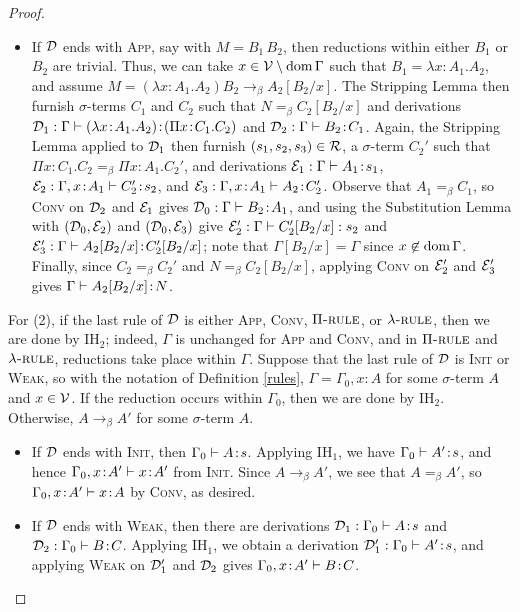 \documentclass[reqno, twoside]{article}
\begin{document}
\begin{proof}
\begin{itemize}
            \item If $\mathcal{D}$ ends with \textsc{App}, say with $M=B_1\,B_2$, then reductions within either $B_1$ or $B_2$ are trivial. Thus, we can take $x\in\mathcal{V}\setminus\operatorname{dom}\Gamma$ such that $B_1=\lambda x\!:\!A_1.A_2$, and assume $M=(\lambda x\!:\!A_1.A_2)B_2\rightarrow_\beta A_2[B_2/x]$. The Stripping Lemma then furnish $\sigma$-terms $C_1$ and $C_2$ such that $N=_\beta C_2[B_2/x]$ and derivations $\mathcal{D}_1:\Gamma\vdash(\lambda x\!:\!A_1.A_2)\!:\!(\Pi x\!:\!C_1.C_2)$ and $\mathcal{D}_2:\Gamma\vdash B_2\!:\!C_1$. Again, the Stripping Lemma applied to $\mathcal{D}_1$ then furnish $(s_1,s_2,s_3)\in\mathcal{R}$, a $\sigma$-term $C_2'$ such that $\Pi x\!:\!C_1.C_2=_\beta\Pi x\!:\!A_1.C_2'$, and derivations $\mathcal{E}_1:\Gamma\vdash A_1\!:\!s_1$, $\mathcal{E}_2:\Gamma,x\!:\!A_1\vdash C'_2\!:\!s_2$, and $\mathcal{E}_3:\Gamma,x\!:\!A_1\vdash A_2\!:\!C_2'$. Observe that $A_1=_\beta C_1$, so \textsc{Conv} on $\mathcal{D}_2$ and $\mathcal{E}_1$ gives $\mathcal{D}_0:\Gamma\vdash B_2\!:\!A_1$, and using the Substitution Lemma with $(\mathcal{D}_0,\mathcal{E}_2)$ and $(\mathcal{D}_0,\mathcal{E}_3)$ give $\mathcal{E}_2':\Gamma\vdash C_2'[B_2/x]:s_2$ and $\mathcal{E}_3':\Gamma\vdash A_2[B_2/x]\!:\!C_2'[B_2/x]$; note that $\Gamma[B_2/x]=\Gamma$ since $x\not\in\operatorname{dom}\Gamma$. Finally, since $C_2=_\beta C_2'$ and $N=_\beta C_2[B_2/x]$, applying \textsc{Conv} on $\mathcal{E}_2'$ and $\mathcal{E}_3'$ gives $\Gamma\vdash A_2[B_2/x]\!:\!N$.
        \end{itemize}
        For (2), if the last rule of $\mathcal{D}$ is either \textsc{App}, \textsc{Conv}, $\Pi{\normalfont\textsc{-rule}}$, or $\lambda{\normalfont\textsc{-rule}}$, then we are done by $\mathrm{IH}_2$; indeed, $\Gamma$ is unchanged for \textsc{App} and \textsc{Conv}, and in $\Pi{\normalfont\textsc{-rule}}$ and $\lambda{\normalfont\textsc{-rule}}$, reductions take place within $\Gamma$. Suppose that the last rule of $\mathcal{D}$ is \textsc{Init} or \textsc{Weak}, so with the notation of Definition \ref{rules}, $\Gamma=\Gamma_0,x\!:\!A$ for some $\sigma$-term $A$ and $x\in\mathcal{V}$. If the reduction occurs within $\Gamma_0$, then we are done by $\mathrm{IH}_2$. Otherwise, $A\rightarrow_\beta A'$ for some $\sigma$-term $A$.
        \begin{itemize}\small\vspace{-0.05in}
            \item If $\mathcal{D}$ ends with \textsc{Init}, then $\Gamma_0\vdash A\!:\!s$. Applying $\mathrm{IH}_1$, we have $\Gamma_0\vdash A'\!:\!s$, and hence $\Gamma_0,x\!:\!A'\vdash x\!:\!A'$ from \textsc{Init}. Since $A\rightarrow_\beta A'$, we see that $A=_\beta A'$, so $\Gamma_0,x\!:\!A'\vdash x\!:\!A$ by \textsc{Conv}, as desired.
                \vspace{-0.05in}
            \item If $\mathcal{D}$ ends with \textsc{Weak}, then there are derivations $\mathcal{D}_1:\Gamma_0\vdash A\!:\!s$ and $\mathcal{D}_2:\Gamma_0\vdash B\!:\!C$. Applying $\mathrm{IH}_1$, we obtain a derivation $\mathcal{D}_1':\Gamma_0\vdash A'\!:\!s$, and applying \textsc{Weak} on $\mathcal{D}_1'$ and $\mathcal{D}_2$ gives $\Gamma_0,x\!:\!A'\vdash B\!:\!C$.
        \end{itemize}\vspace{-0.25in}
    \end{proof}
\end{document}
